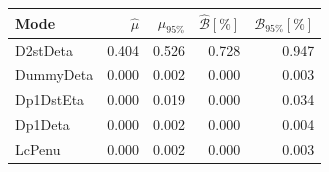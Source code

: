 \begin{tabular}{lrrrr}
\hline
Mode & $\hat{\mu}$ & $\mu_{95\%}$ & $\hat{\mathcal{B}}[\%]$ & $\mathcal{B}_{95\%}[\%]$ \\
\hline
D2stDeta & 0.404 & 0.526 & 0.728 & 0.947 \\
DummyDeta & 0.000 & 0.002 & 0.000 & 0.003 \\
Dp1DstEta & 0.000 & 0.019 & 0.000 & 0.034 \\
Dp1Deta & 0.000 & 0.002 & 0.000 & 0.004 \\
LcPenu & 0.000 & 0.002 & 0.000 & 0.003 \\
\hline
\end{tabular}
